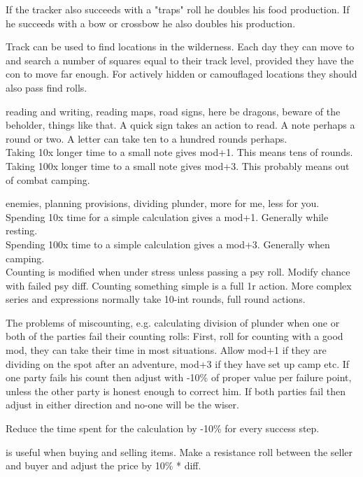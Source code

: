 If the tracker also succeeds with a "traps" roll he doubles his food production. If he succeeds with a bow or crossbow he also doubles his production.

Track can be used to find locations in the wilderness. Each day they can move to and search a number of squares equal to their track level, provided they have the con to move far enough. For actively hidden or camouflaged locations they should also pass find rolls.


 reading and writing, reading maps, road signs, here be dragons, beware of the beholder, things like that. A quick sign takes an action to read. A note perhaps a round or two. A letter can take ten to a hundred rounds perhaps. \\
Taking 10x longer time to a small note gives mod+1. This means tens of rounds. \\
Taking 100x longer time to a small note gives mod+3. This probably means out of combat camping.


 enemies, planning provisions, dividing plunder, more for me, less for you. \\
Spending 10x time for a simple calculation gives a mod+1. Generally while resting.\\
Spending 100x time to a simple calculation gives a mod+3. Generally when camping.\\

Counting is modified when under stress unless passing a psy roll. Modify chance with failed psy diff. Counting something simple is a full 1r action. More complex series and expressions normally take 10-int rounds, full round actions.

The problems of miscounting, e.g. calculating division of plunder when one or both of the parties fail their counting rolls: First, roll for counting with a good mod, they can take their time in most situations. Allow mod+1 if they are dividing on the spot after an adventure, mod+3 if they have set up camp etc.
If one party fails his count then adjust with -10\% of proper value per failure point, unless the other party is honest enough to correct him. If both parties fail then adjust in either direction and no-one will be the wiser.

Reduce the time spent for the calculation by -10\% for every success step.


 is useful when buying and selling items. Make a resistance roll between the seller and buyer and adjust the price by 10\% * diff.

